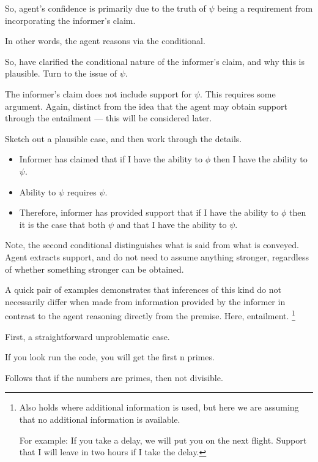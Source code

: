\documentclass[10pt]{article}
\newcommand{\hozlinedash}[0]{%
  \noindent\hdashrule[0.5ex][c]{\textwidth}{.1pt}{2.5pt}
}
\begin{document}
So, agent's confidence is primarily due to the truth of \(\psi\) being a requirement from incorporating the informer's claim.

In other words, the agent reasons via the conditional.

\hozlinedash

So, have clarified the conditional nature of the informer's claim, and why this is plausible.
Turn to the issue of \(\psi\).

\hozlinedash

The informer's claim does not include support for \(\psi\).
This requires some argument.
Again, distinct from the idea that the agent may obtain support through the entailment --- this will be considered later.

Sketch out a plausible case, and then work through the details.


\begin{itemize}
\item Informer has claimed that if I have the ability to \(\phi\) then I have the ability to \(\psi\).
\item Ability to \(\psi\) requires \(\psi\).
\item Therefore, informer has provided support that if I have the ability to \(\phi\) then it is the case that both \(\psi\) and that I have the ability to \(\psi\).
\end{itemize}

Note, the second conditional distinguishes what is said from what is conveyed.
Agent extracts support, and do not need to assume anything stronger, regardless of whether something stronger can be obtained.

A quick pair of examples demonstrates that inferences of this kind do not necessarily differ when made from information provided by the informer in contrast to the agent reasoning directly from the premise.
Here, entailment.\nolinebreak
\footnote{
  Also holds where additional information is used, but here we are assuming that no additional information is available.

  For example:
  If you take a delay, we will put you on the next flight.
  Support that I will leave in two hours if I take the delay.
}


First, a straightforward unproblematic case.

If you look run the code, you will get the first n primes.

Follows that if the numbers are primes, then not divisible.
\end{document}
